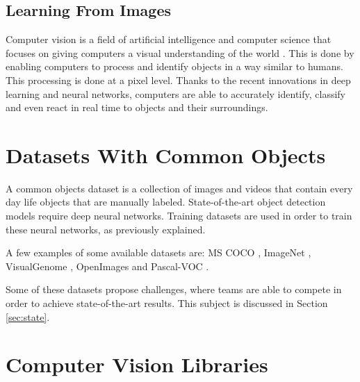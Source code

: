      
    \subsection{Learning From Images}
    \par Computer vision is a field of artificial intelligence and computer science that focuses on giving computers a visual understanding of the world \cite{cv} \cite{cv2}. This is done by enabling computers to process and identify objects in a way similar to humans. This processing is done at a pixel level.
    Thanks to the recent innovations in deep learning and neural networks, computers are able to accurately identify, classify and even react in real time to objects and their surroundings. 


\newpage

    \section{Datasets With Common Objects}

    \label{sec:dataset}

    \par A common objects dataset is a collection of images and videos that contain every day life objects that are manually labeled.  State-of-the-art object detection models require deep neural networks. Training datasets are used in order to train these neural networks, as previously explained. 
    

    \par A few examples of some available datasets are:  MS COCO \cite{Lin2014}, ImageNet \cite{Takamitsu1978} , VisualGenome \cite{Language2015}, OpenImages \cite{Kuznetsova2018} and Pascal-VOC \cite{Everingham2010}.

    \par Some of these datasets propose challenges, where teams are able to compete in order to achieve state-of-the-art results. This subject is discussed in Section \ref{sec:state}.



\section{Computer Vision Libraries}
\label{sec:libraries_cv}



